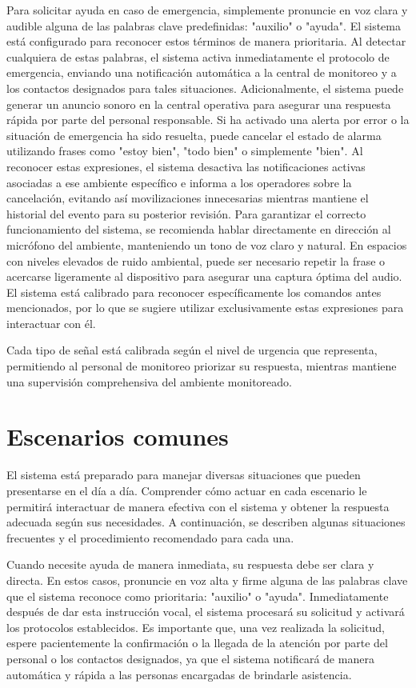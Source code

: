 Para solicitar ayuda en caso de emergencia, simplemente pronuncie en voz clara y audible alguna de las palabras clave predefinidas: "auxilio" o "ayuda". El sistema está configurado para reconocer estos términos de manera prioritaria. Al detectar cualquiera de estas palabras, el sistema activa inmediatamente el protocolo de emergencia, enviando una notificación automática a la central de monitoreo y a los contactos designados para tales situaciones. Adicionalmente, el sistema puede generar un anuncio sonoro en la central operativa para asegurar una respuesta rápida por parte del personal responsable. Si ha activado una alerta por error o la situación de emergencia ha sido resuelta, puede cancelar el estado de alarma utilizando frases como "estoy bien", "todo bien" o simplemente "bien". Al reconocer estas expresiones, el sistema desactiva las notificaciones activas asociadas a ese ambiente específico e informa a los operadores sobre la cancelación, evitando así movilizaciones innecesarias mientras mantiene el historial del evento para su posterior revisión. Para garantizar el correcto funcionamiento del sistema, se recomienda hablar directamente en dirección al micrófono del ambiente, manteniendo un tono de voz claro y natural. En espacios con niveles elevados de ruido ambiental, puede ser necesario repetir la frase o acercarse ligeramente al dispositivo para asegurar una captura óptima del audio. El sistema está calibrado para reconocer específicamente los comandos antes mencionados, por lo que se sugiere utilizar exclusivamente estas expresiones para interactuar con él.

Cada tipo de señal está calibrada según el nivel de urgencia que representa, permitiendo al personal de monitoreo priorizar su respuesta, mientras mantiene una supervisión comprehensiva del ambiente monitoreado.

\section*{Escenarios comunes}

El sistema está preparado para manejar diversas situaciones que pueden presentarse en el día a día. Comprender cómo actuar en cada escenario le permitirá interactuar de manera efectiva con el sistema y obtener la respuesta adecuada según sus necesidades. A continuación, se describen algunas situaciones frecuentes y el procedimiento recomendado para cada una.

Cuando necesite ayuda de manera inmediata, su respuesta debe ser clara y directa. En estos casos, pronuncie en voz alta y firme alguna de las palabras clave que el sistema reconoce como prioritaria: "auxilio" o "ayuda". Inmediatamente después de dar esta instrucción vocal, el sistema procesará su solicitud y activará los protocolos establecidos. Es importante que, una vez realizada la solicitud, espere pacientemente la confirmación o la llegada de la atención por parte del personal o los contactos designados, ya que el sistema notificará de manera automática y rápida a las personas encargadas de brindarle asistencia.

